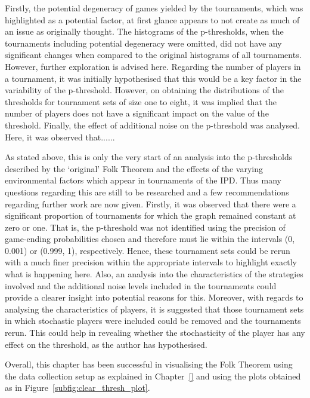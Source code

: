 Firstly, the potential degeneracy of games yielded by the tournaments, which was
highlighted as a potential factor, at first glance appears to not create as much
of an issue as originally thought. The histograms of the p-thresholds, when the
tournaments including potential degeneracy were omitted, did not have any
significant changes when compared to the original histograms of all tournaments.
However, further exploration is advised here. Regarding the number of players in
a tournament, it was initially hypothesised that this would be a key factor in
the variability of the p-threshold. However, on obtaining the distributions of
the thresholds for tournament sets of size one
to eight, it was implied that the number of players does not have a significant
impact on the value of the threshold. Finally, the effect of additional noise on
the p-threshold was analysed. Here, it was observed that...... 

As stated above, this is only the very start of an analysis into the
p-thresholds described by the `original' Folk Theorem and the effects of the
varying environmental factors which appear in tournaments of the IPD. Thus many
questions regarding this are still to be researched and a few recommendations
regarding further work are now given. Firstly, it was observed that there were a
significant proportion of tournaments for which the graph remained constant at
zero or one. That is, the p-threshold was not identified using the precision of
game-ending probabilities chosen and therefore must lie within the intervals (0,
0.001) or (0.999, 1), respectively. Hence, these tournament sets could be rerun
with a much finer precision within the appropriate intervals to highlight
exactly what is happening here. Also, an analysis into the characteristics of
the strategies involved and the additional noise levels included in the
tournaments could provide a clearer insight into potential reasons for this.
Moreover, with regards to analysing the characteristics of players, it is
suggested that those tournament sets in which stochastic players were included
could be removed and the tournaments rerun. This could help in revealing whether
the stochasticity of the player has any effect on the threshold, as the author
has hypothesised. 

Overall, this chapter has been successful in visualising the Folk Theorem using
the data collection setup as explained in Chapter~\ref{} and using the plots
obtained as in Figure~\ref{subfig:clear_thresh_plot}.